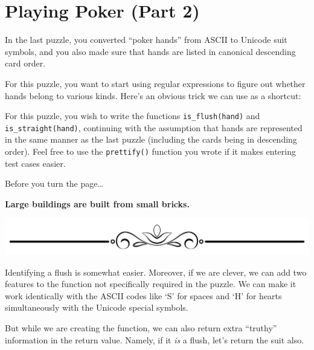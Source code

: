 \newpage

\hypertarget{playing-poker-part-2}{%
\section{Playing Poker (Part 2)}\label{playing-poker-part-2}}

In the last puzzle, you converted ``poker hands'' from ASCII to Unicode
suit symbols, and you also made sure that hands are listed in canonical
descending card order.

For this puzzle, you want to start using regular expressions to figure
out whether hands belong to various kinds. Here's an obvious trick we
can use as a shortcut:

\begin{Shaded}
\begin{Highlighting}[]
\end{Highlighting}
\end{Shaded}

For this puzzle, you wish to write the functions
\texttt{is\_flush(hand)} and \texttt{is\_straight(hand)}, continuing
with the assumption that hands are represented in the same manner as the
last puzzle (including the cards being in descending order). Feel free
to use the \texttt{prettify()} function you wrote if it makes entering
test cases easier.

Before you turn the page\ldots{}

\textbf{Large buildings are built from small bricks.}

\includegraphics{images/Elegant-Flourish-Frame-Extrapolated-19.svg}

\newpage

Identifying a flush is somewhat easier. Moreover, if we are clever, we
can add two features to the function not specifically required in the
puzzle. We can make it work identically with the ASCII codes like `S'
for spaces and `H' for hearts simultaneously with the Unicode special
symbols.

But while we are creating the function, we can also return extra
``truthy'' information in the return value. Namely, if it \emph{is} a
flush, let's return the suit also.


